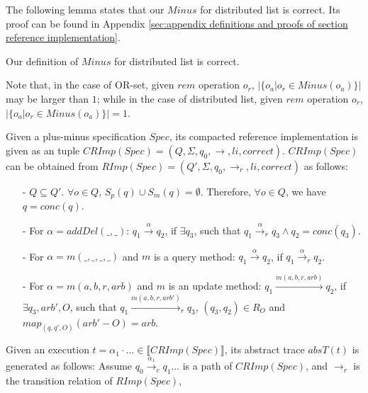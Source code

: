 The following lemma states that our $Minus$ for distributed list is correct. Its proof can be found in Appendix \ref{sec:appendix definitions and proofs of section reference implementation}.

\begin{lemma}
\label{lemma:Minus for distributed list is correct}
Our definition of $Minus$ for distributed list is correct.
\end{lemma}

Note that, in the case of OR-set, given $rem$ operation $o_r$, $\vert \{ o_a \vert o_r \in Minus(o_a) \} \vert$ may be larger than $1$; while in the case of distributed list, given $rem$ operation $o_r$, $\vert \{ o_a \vert o_r \in Minus(o_a) \} \vert = 1$.

Given a plus-minus specification $Spec$, its compacted reference implementation is given as an tuple $CRImp(Spec) = (Q,\Sigma,q_0,\rightarrow,li,correct)$. $CRImp(Spec)$ can be obtained from $RImp(Spec) = (Q',\Sigma,q_0,\rightarrow_r,li,correct)$ as follows:

\begin{itemize}
\setlength{\itemsep}{0.5pt}
\item[-] $Q \subseteq Q'$. $\forall o \in Q$, $S_p(q) \cup S_m(q) = \emptyset$. Therefore, $\forall o \in Q$, we have $q = conc(q)$.

\item[-] For $\alpha = addDel(\_,\_)$: $q_1 {\xrightarrow{\alpha}} q_2$, if $\exists q_3$, such that $q_1 {\xrightarrow{\alpha}}_r q_3 \wedge q_2 = conc(q_3)$.

\item[-] For $\alpha=m(\_,\_,\_,\_)$ and $m$ is a query method: $q_1 {\xrightarrow{\alpha}} q_2$, if $q_1 {\xrightarrow{\alpha}}_r q_2$.

\item[-] For $\alpha=m(a,b,r,arb)$ and $m$ is an update method: $q_1 {\xrightarrow{m(a,b,r,arb)}} q_2$, if $\exists q_3,arb',O$, such that $q_1 {\xrightarrow{m(a,b,r,arb')}}_r q_3$, $(q_3,q_2) \in R_{O}$ and $map_{(q,q',O)}(arb' - O) = arb$.
\end{itemize}

Given an execution $t = \alpha_1 \cdot \ldots \in \llbracket CRImp(Spec) \rrbracket$, its abstract trace $absT(t)$ is generated as follows: Assume $q_0 {\xrightarrow{\alpha_1}}_c q_1 \ldots$ is a path of $CRImp(Spec)$, and $\rightarrow_r$ is the transition relation of $RImp(Spec)$,

